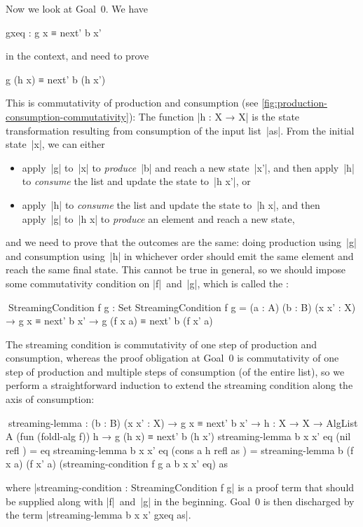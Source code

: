 Now we look at Goal~0.
We have
\begin{code}
gxeq : g x ≡ next' b x'
\end{code}
in the context, and need to prove
\begin{code}
g (h x) ≡ next' b (h x')
\end{code}
This is commutativity of production and consumption (see \autoref{fig:production-consumption-commutativity}):
The function |h : X → X| is the state transformation resulting from consumption of the input list~|as|.
From the initial state~|x|, we can either
\begin{itemize}
\item apply~|g| to~|x| to \emph{produce}~|b| and reach a new state~|x'|, and then apply~|h| to \emph{consume} the list and update the state to~|h x'|, or
\item apply~|h| to \emph{consume} the list and update the state to~|h x|, and then apply~|g| to~|h x| to \emph{produce} an element and reach a new state,
\end{itemize}
and we need to prove that the outcomes are the same: doing production using~|g| and consumption using~|h| in whichever order should emit the same element and reach the same final state.
This cannot be true in general, so we should impose some commutativity condition on |f|~and~|g|, which is called the :
\begin{code}
^^^StreamingCondition f g : Set
StreamingCondition f g =
  (a : A) (b : B) (x x' : X) → g x ≡ next' b x' → g (f x a) ≡ next' b (f x' a)
\end{code}
The streaming condition is commutativity of one step of production and consumption, whereas the proof obligation at Goal~0 is commutativity of one step of production and multiple steps of consumption (of the entire list), so we perform a straightforward induction to extend the streaming condition along the axis of consumption:
\begin{code}
^^^streaming-lemma :
  (b : B) (x x' : X) → g x ≡ next' b x' →
  {h : X → X} → AlgList A (fun (foldl-alg f)) h → g (h x) ≡ next' b (h x')
streaming-lemma b x x' eq (nil       refl     ) = eq
streaming-lemma b x x' eq (cons a h  refl as  ) =
  streaming-lemma b (f x a) (f x' a) (streaming-condition f g a b x x' eq) as
\end{code}
where |streaming-condition : StreamingCondition f g| is a proof term that should be supplied along with |f|~and~|g| in the beginning.
Goal~0 is then discharged by the term |streaming-lemma b x x' gxeq as|.

